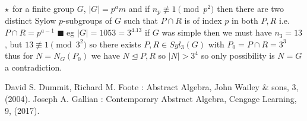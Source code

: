 \documentclass[11pt]{extarticle}
\newcommand{\y}{$\blacksquare\;$}
\begin{document}
\begin{multicols}{2}
{$ \large\star $ for a finite group $ G $, $ |G|=p^am $ and if $ n_p\not\equiv 1\pmod{p^2} $ then there are two distinct Sylow $ p $-subgroups of $ G $ such that $ P\cap R $ is of index $ p $ in both $ P,R $ i.e. $ P\cap R=p^{a-1} $ 
\y eg $ |G|=1053=3^4.13 $ if $ G $ was simple then we must have $ n_3=13 $, but $ 13\not\equiv 1\pmod{3^2} $ so there exists $ P,R\in Syl_3(G) $ with $P_0=P\cap R=3^3 $ thus for $ N=N_G(P_0) $  we have $ N\trianglelefteq P,R $ so $ |N|>3^4 $ so only possibility is $N=G$  a contradiction.}
	\begin{thebibliography}{9}
		David S. Dummit, Richard M. Foote : Abstract Algebra, John Wailey \& sons, 3, (2004).
		Joseph A. Gallian : Contemporary Abstract Algebra, Cengage Learning, 9, (2017).
	\end{thebibliography}
\end{multicols}
\end{document}
